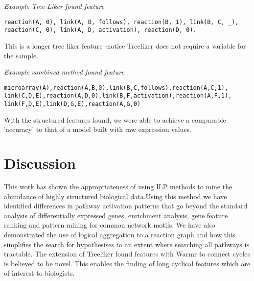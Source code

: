 \documentclass[runningheads,a4paper]{llncs}
\begin{document}
\noindent
{\it{Example Tree Liker found feature}}

\begin{verbatim}
reaction(A, 0), link(A, B, follows), reaction(B, 1), link(B, C, _),    
reaction(C, 0), link(A, D, activation), reaction(D, 0).
\end{verbatim}
\noindent 
This is a longer tree liker feature -notice Treeliker does not require a variable for the sample.  
\newline

\noindent
{\it{Example combined method found feature}}
\begin{verbatim}
microarray(A),reaction(A,B,0),link(B,C,follows),reaction(A,C,1),
link(C,D,E),reaction(A,D,0),link(B,F,activation),reaction(A,F,1),
link(F,D,E),link(D,G,E),reaction(A,G,0)
\end{verbatim}
\noindent
With the structured features found, we were able to achieve a comparable 'accuracy' to that of a model built with raw expression values. 

\section{Discussion}
This work has shown the appropriateness of using ILP methods to mine the abundance of highly structured biological data.Using this method we have identified differences in pathway activation patterns that go beyond the standard analysis of differentially expressed genes, enrichment analysis, gene feature ranking and pattern mining for common network motifs. We have also demonstrated the use of logical aggregation to a  reaction graph and how this simplifies the search for hypothesises to an extent where searching all pathways is tractable. The extension of Treeliker found features with Warmr to connect cycles is believed to be novel. This enables the finding of long cyclical features which are of interest to biologists. 
\newline
\newline




\begingroup
\let\clearpage\relax
{}
\endgroup

%

%
%
\end{document}
